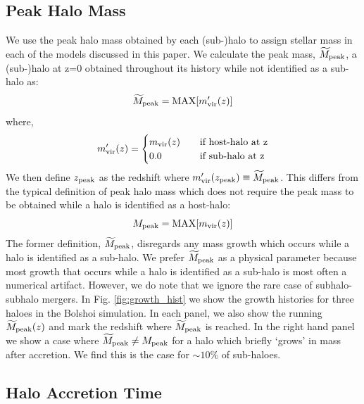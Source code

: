 \documentclass[useAMS,fleqn,usenatbib]{mnras}
\begin{document}
\subsection{Peak Halo Mass}

We use the peak halo mass obtained by each (sub-)halo to assign stellar mass in each of the models discussed in this paper.  We calculate the peak mass, $\widetilde{M}_{\rm peak}$, a (sub-)halo at z=0 obtained throughout its history while not identified as a sub-halo as:
%
\begin{equation}
\widetilde{M}_{\rm peak} = {\rm MAX}[m^{\prime}_{\rm vir}(z)]
\end{equation}
%
where,
%
\begin{equation}
m^{\prime}_{\rm vir}(z)= 
\begin{cases}
    m_{\rm vir}(z)   & \quad \text{if host-halo at z}\\
    0.0                   & \quad \text{if sub-halo at z} \\
  \end{cases}
\end{equation}
%
We then define $z_{\rm peak}$ as the redshift where $m^{\prime}_{\rm vir}(z_{\rm peak})\equiv \widetilde{M}_{\rm peak}$.  This differs from the typical definition of peak halo mass which does not require the peak mass to be obtained while a halo is identified as a host-halo:
%
\begin{equation}
M_{\rm peak} = {\rm MAX}[m_{\rm vir}(z)]
\end{equation}
%
The former definition, $\widetilde{M}_{\rm peak}$, disregards any mass growth which occurs while a halo is identified as a sub-halo. We prefer $\widetilde{M}_{\rm peak}$ as a physical parameter because most growth that occurs while a halo is identified as a sub-halo is most often a numerical artifact.  However, we do note that we ignore the rare case of subhalo-subhalo mergers.  In Fig. \ref{fig:growth_hist} we show the growth histories for three haloes in the Bolshoi simulation.  In each panel, we also show the running $\widetilde{M}_{\rm peak}(z)$ and mark the redshift where $\widetilde{M}_{\rm peak}$ is reached.  In the right hand panel we show a case where $\widetilde{M}_{\rm peak} \neq {M}_{\rm peak}$ for a halo which briefly `grows' in mass after accretion.  We find this is the case for $\sim 10\%$ of sub-haloes.    


\subsection{Halo Accretion Time}
\label{sec:halo_acc_time}
\end{document}
